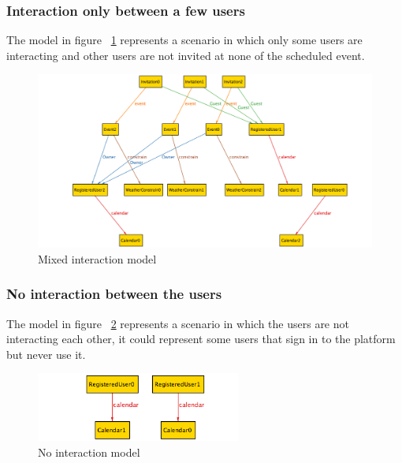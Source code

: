 \subsubsection{Interaction only between a few users}
The model in figure ~\ref{fig:mixint} represents a scenario in which only some users are interacting and other users are not invited at none of the scheduled event.
\begin{center}
 \begin{figure}[H]
    \includegraphics[width=1.1\textwidth,height=0.7\textwidth]{../Alloy/mixInt.png}
    \caption{Mixed interaction model}
     \label{fig:mixint}
     \end{figure}
   \end{center} 
\subsubsection{No interaction between the users}
The model in figure ~\ref{fig:noint} represents a scenario in which the users are not interacting each other, it could represent some users that sign in to the platform but never use it.
\begin{center}
 \begin{figure}[H]
    \includegraphics[width=0.6\textwidth]{../Alloy/noInteration.png}
    \caption{No interaction model}
     \label{fig:noint}
     \end{figure}
   \end{center} 